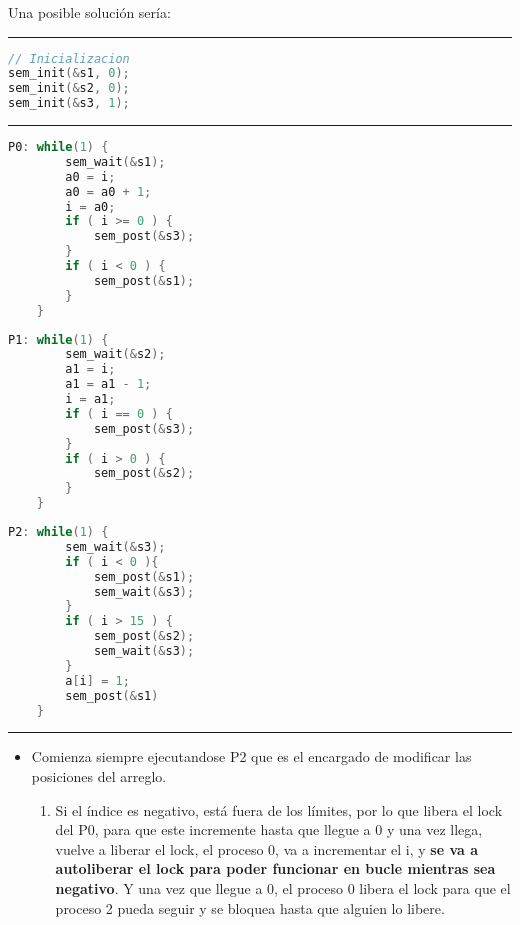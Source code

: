 \documentclass[openany]{book}
\begin{document}
\begin{rta}
    Una posible solución sería:
    \newline
    \hrule
\begin{lstlisting}[language=C]
// Inicializacion
sem_init(&s1, 0);
sem_init(&s2, 0);
sem_init(&s3, 1);
\end{lstlisting}
    \hrule
    \begin{minipage}{0.32\textwidth}
\begin{lstlisting}[language=C]
    P0: while(1) {
        sem_wait(&s1);
        a0 = i;
        a0 = a0 + 1;
        i = a0;
        if ( i >= 0 ) {
            sem_post(&s3);
        }
        if ( i < 0 ) {
            sem_post(&s1);
        }
    }
\end{lstlisting}
    \end{minipage}
    \begin{minipage}{0.32\textwidth}
\begin{lstlisting}[language=C]
    P1: while(1) {
        sem_wait(&s2);
        a1 = i;
        a1 = a1 - 1;
        i = a1;
        if ( i == 0 ) {
            sem_post(&s3);
        }
        if ( i > 0 ) {
            sem_post(&s2);
        }
    }
\end{lstlisting}
    \end{minipage}
    \begin{minipage}{0.32\textwidth}
\begin{lstlisting}[language=C]
    P2: while(1) {
        sem_wait(&s3);
        if ( i < 0 ){
            sem_post(&s1);
            sem_wait(&s3);
        }
        if ( i > 15 ) {
            sem_post(&s2);
            sem_wait(&s3);
        }
        a[i] = 1;
        sem_post(&s1)
    }
\end{lstlisting}
    \end{minipage}
    \hrule
    \begin{itemize}
        \item Comienza siempre ejecutandose P2 que es el encargado de modificar las posiciones del arreglo. 
        \begin{enumerate}
            \item Si el índice es negativo, está fuera de los límites, por lo que libera el lock del P0, para que este incremente hasta que llegue a 0 y una vez llega, vuelve a liberar el lock, el proceso 0, va a incrementar el i, y \textbf{se va a autoliberar el lock para poder funcionar en bucle mientras sea negativo}. Y una vez que llegue a 0, el proceso 0 libera el lock para que el proceso 2 pueda seguir y se bloquea hasta que alguien lo libere.

\end{enumerate}
\end{itemize}
\end{rta}
\end{document}
